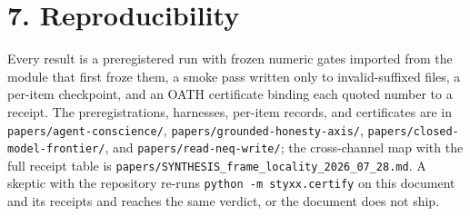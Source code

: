 \documentclass[11pt]{article}
\begin{document}
\section{7. Reproducibility}\label{7-reproducibility}

Every result is a preregistered run with frozen numeric gates imported from the module that first froze them, a smoke pass written only to invalid-suffixed files, a per-item checkpoint, and an OATH certificate binding each quoted number to a receipt. The preregistrations, harnesses, per-item records, and certificates are in \texttt{papers/agent-conscience/}, \texttt{papers/grounded-honesty-axis/}, \texttt{papers/closed-model-frontier/}, and \texttt{papers/read-neq-write/}; the cross-channel map with the full receipt table is \texttt{papers/SYNTHESIS\_frame\_locality\_2026\_07\_28.md}. A skeptic with the repository re-runs \texttt{python\ -m\ styxx.certify} on this document and its receipts and reaches the same verdict, or the document does not ship.
\end{document}

